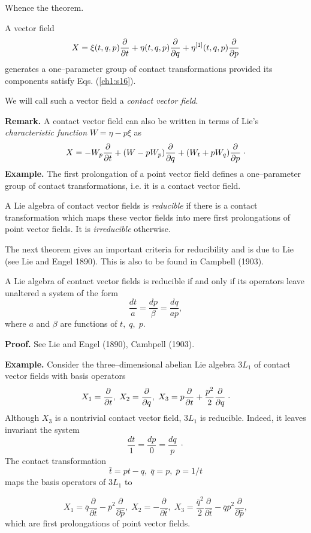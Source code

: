 Whence the theorem.
\begin{theo}
\begin{em}
A vector field
\[X=\xi (t,q,p)\frac{\partial}{\partial t}+\eta (t,q,p)\frac{\partial}{\partial q }+\eta^{[1]} (t,q,p)\frac{\partial}{\partial p }\]
generates a one--parameter group of contact transformations provided its
components satisfy Eqs. (\ref{ch1:s16}).

We will call such a vector field a {\em contact vector field}.
\end{em}
\end{theo}

{\bf Remark.} A contact vector field can also be written in terms of 
Lie's {\em characteristic function} $W =\eta -p\xi$ as
\[X=-W_p\frac{\partial}{\partial t}+(W-pW_p)\frac{\partial}{\partial q }+(W_t+pW_q)\frac{\partial}{\partial p }\; \cdot \]
{\bf Example.} The first prolongation of a point vector field defines a
one--parameter  group of contact transformations, i.e. it is a contact
vector field.
\begin{defi}
\begin{em}
A Lie algebra of contact vector fields is {\em reducible} if there
is a contact
transformation which maps these vector fields into mere first prolongations
of point vector fields. It is {\em irreducible} otherwise.
\end{em}
\end{defi}
The next theorem gives an important criteria for reducibility and is due
to Lie (see Lie and Engel 1890). This is also to be found in Campbell (1903).
\begin{theo}
\begin{em}
A Lie algebra of contact vector fields is reducible if and only if its
operators leave unaltered a system of the form
\begin{equation}
\label{ch1:s17}
\frac{dt}{a}=\frac{dp}{\beta}=\frac{dq}{ap},
\end{equation}
where $a$ and $\beta$ are functions of $t,\;q,\;p$.
\end{em}
\end{theo}
{\bf Proof.} See  Lie and Engel (1890), Cambpell (1903). 

{\bf Example.} Consider the three--dimensional abelian Lie algebra $3L_1$ of
contact vector fields with basis operators
\[X_1=\frac{\partial}{\partial t},\;X_2=\frac{\partial}{\partial q },\;X_3=p\frac{\partial}{\partial t}+\frac{p^2}{2}\frac{\partial}{\partial q } \; \cdot \]
Although $X_3$ is a nontrivial contact vector field, $3L_1$ is reducible.
Indeed, it leaves invariant the system
\[\frac{dt}{1}=\frac{dp}{0}=\frac{dq}{p}\; \cdot \]
The contact transformation
\[\bar t=pt-q,\;\bar q=p,\;\bar p=1/t\]
maps  the basis operators of $3L_1$ to

\[X_1=\bar q\frac{\partial}{\partial \bar t}-\bar p^2\frac{\partial}{\partial  \bar p},\;
X_2=-\frac{\partial}{\partial \bar t},\;
X_3=\frac{\bar q^2}{2}\frac{\partial}{\partial \bar t}-\bar q\bar p^2
\frac{\partial}{\partial \bar p},\]
which are first prolongations of point vector fields.

